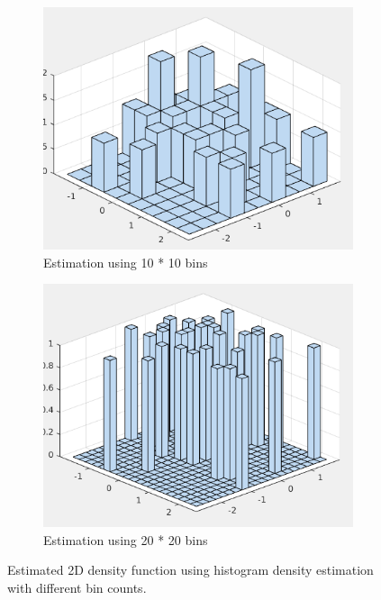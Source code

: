 \documentclass[12pt]{article}
\begin{document}
\begin{itemize}
\begin{figure}
\begin{subfigure}{0.45\textwidth}
\includegraphics[scale=0.35]{Imgs/5-28.png}
\caption{Estimation using 10 * 10 bins}
\end{subfigure}
\begin{subfigure}{0.45\textwidth}
\centering
\includegraphics[scale=0.35]{Imgs/5-29.png}
\caption{Estimation using 20 * 20 bins}
\end{subfigure}
\caption{Estimated 2D density function using histogram density estimation with different bin counts.}
\label{fig:5-9}
\end{figure}


\end{itemize}




\end{document}
